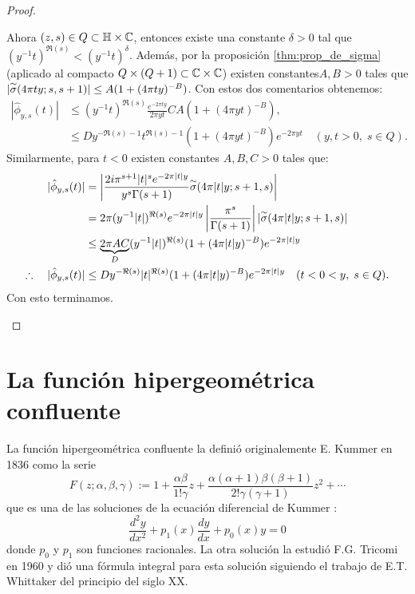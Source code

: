 \documentclass[../../tesis_maestria]{subfiles}
\begin{document}
\begin{proof}
\begin{enumerate}[label=\emph{\roman*})]
  Ahora $(z,s)\in Q\subset\mathbb{H}\times\mathbb{C}$, entonces existe una constante $\delta>0$ tal que
  $(y^{-1}t)^{\Re(s)}<(y^{-1}t)^{\delta}$.
  Adem\'as, por la proposici\'on \ref{thm:prop_de_sigma} (aplicado al compacto
  $Q\times(Q+1)\subset\mathbb{C}\times\mathbb{C}$) existen constantes$A,B>0$ tales que
  $|\overset{\sim}{\sigma}(4\pi ty;s,s+1)|\leq A(1+(4\pi ty)^{-B})$. Con estos dos comentarios obtenemos:
  \begin{align}
    |\hat{\phi}_{y,s}(t)|
    &\leq (y^{-1}t)^{\Re(s)}\frac{e^{-2\pi ty}}{2\pi yt}
      C A(1+(4\pi yt)^{-B}),\nonumber\\
    &\leq D y^{-\Re(s)-1}t^{\Re(s)-1}(1+(4\pi yt)^{-B})e^{-2\pi yt}\quad(y,t>0,\;s\in Q).
      \label{eq:phihatabsapprox}
  \end{align}
  Similarmente, para $t<0$ existen constantes $A,B,C>0$ tales que:
  \begin{align*}
    |\hat{\phi}_{y,s}(t)|
    &=\left| \dfrac{2i\pi^{s+1}|t|^se^{-2\pi|t|y}}{y^s\Gamma(s+1)}\overset{\sim}{\sigma}(4\pi|t|y;s+1,s) \right|\\
    &=2\pi(y^{-1}|t|)^{\Re(s)}e^{-2\pi|t|y}\left| \frac{\pi^s}{\Gamma(s+1)} \right||\overset{\sim}{\sigma}(4\pi|t|y;s+1,s)|\\
    &\leq \underset{D}{\underbrace{2\pi AC}}(y^{-1}|t|)^{\Re(s)}(1+(4\pi |t|y)^{-B})e^{-2\pi|t|y}\\
    \therefore\quad |\hat{\phi}_{y,s}(t)|
    &\leq D y^{-\Re(s)}|t|^{\Re(s)}(1+(4\pi |t|y)^{-B})e^{-2\pi|t|y} \quad(t<0<y,\; s\in Q).
  \end{align*}
  Con esto terminamos.
\end{enumerate}
\end{proof}


\section{La funci\'on hipergeom\'etrica confluente}\label{ap:fun_hipergeo_conf}
La funci\'on hipergeom\'etrica confluente la defini\'o originalemente E. Kummer en 1836 como la serie
\[
  F(z;\alpha,\beta,\gamma):=1+\frac{\alpha\beta}{1!\gamma}z+
  \frac{\alpha(\alpha+1)\beta(\beta+1)}{2!\gamma(\gamma+1)}z^2+\cdots
\]
que es una de las soluciones de la ecuaci\'on diferencial de Kummer \cite{Kummer1836}:
\[
  \frac{d^2y}{dx^2}+p_1(x)\frac{dy}{dx}+p_0(x)y=0
\]
donde $p_0$ y $p_1$ son funciones racionales. La otra soluci\'on la estudi\'o F.G. Tricomi en
1960 y di\'o una f\'ormula integral para esta soluci\'on \cite[\S2]{TricomiFHC} siguiendo el
trabajo de E.T. Whittaker del principio del siglo XX.
\end{document}
